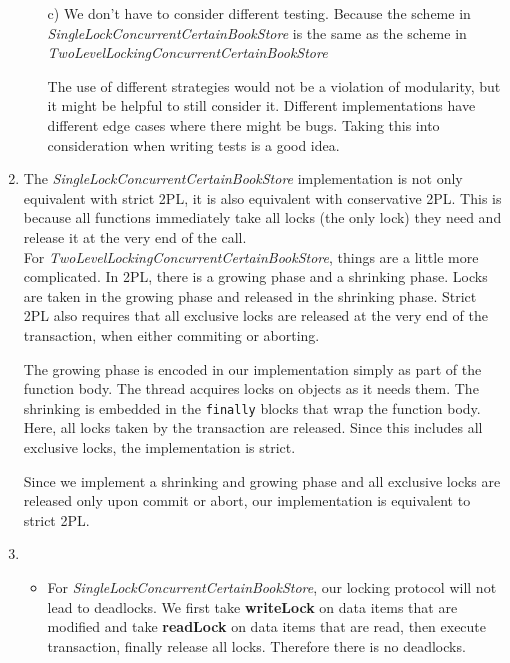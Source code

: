 \documentclass[11pt]{article}
\begin{document}
\begin{enumerate}
\begin{itemize}
		\item[c)]
      We don't have to consider different testing. Because the scheme in
      \textit{SingleLockConcurrentCertainBookStore} is the same as the scheme in
      \textit{TwoLevelLockingConcurrentCertainBookStore}
      
      The use of different strategies would not be a violation of modularity,
      but it might be helpful to still consider it. Different implementations
      have different edge cases where there might be bugs. Taking this into
      consideration when writing tests is a good idea.
		\end{itemize}
  \item
     The \textit{SingleLockConcurrentCertainBookStore} implementation is
     not only equivalent with strict 2PL, it is also equivalent with
     conservative 2PL. This is because all functions immediately take all locks
     (the only lock) they need and release it at the very end of the call.\\

     For \textit{TwoLevelLockingConcurrentCertainBookStore}, things are a little
     more complicated. In 2PL, there is a growing phase and a shrinking
     phase. Locks are taken in the growing phase and released in the shrinking
     phase. Strict 2PL also requires that all exclusive locks are released at
     the very end of the transaction, when either commiting or aborting.

     The growing phase is encoded in our implementation simply as part of the
     function body. The thread acquires locks on objects as it needs them. The
     shrinking is embedded in the \verb|finally| blocks that wrap the function
     body. Here, all locks taken by the transaction are released. Since this
     includes all exclusive locks, the implementation is strict.

     Since we implement a shrinking and growing phase and all exclusive locks
     are released only upon commit or abort, our implementation is equivalent to
     strict 2PL.
	\item
		\begin{itemize}
		 \item
     For \textit{SingleLockConcurrentCertainBookStore}, our locking protocol
     will not lead to deadlocks. We first take \textbf{writeLock} on data items
     that are modified and take \textbf{readLock} on data items that are read,
     then execute transaction, finally release all locks. Therefore there is no
     deadlocks.
		 

\end{itemize}
\end{enumerate}
\end{document}
